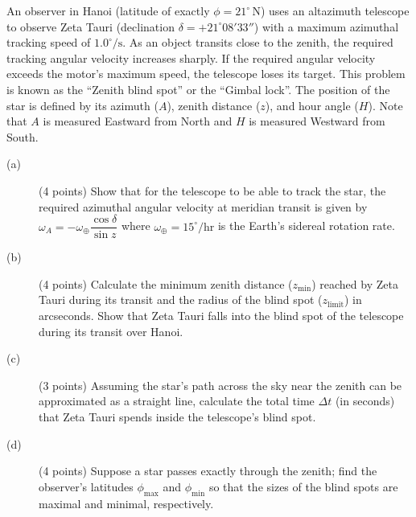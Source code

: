 An observer in Hanoi (latitude of exactly $\phi = 21^\circ\,\mathrm{N}$) uses
an altazimuth telescope to observe Zeta Tauri (declination
$\delta = +21^\circ 08' 33''$) with a maximum azimuthal tracking speed of
$1.0^\circ/\mathrm{s}$. As an object transits close to the zenith, the
required tracking angular velocity increases sharply. If the required angular
velocity exceeds the motor's maximum speed, the telescope loses its target.
This problem is known as the ``Zenith blind spot'' or the ``Gimbal lock''. The
position of the star is defined by its azimuth ($A$), zenith distance ($z$),
and hour angle ($H$). Note that $A$ is measured Eastward from North and $H$ is
measured Westward from South.

\begin{description}
\item[(a)] (4 points) Show that for the telescope to be able to track the
  star, the required azimuthal angular velocity at meridian transit is given
  by $\omega_A = -\omega_\oplus \dfrac{\cos\delta}{\sin z}$ where
  $\omega_\oplus = 15^\circ/\mathrm{hr}$ is the Earth's sidereal rotation
  rate.
\item[(b)] (4 points) Calculate the minimum zenith distance
  ($z_{\mathrm{min}}$) reached by Zeta Tauri during its transit and the radius
  of the blind spot ($z_{\mathrm{limit}}$) in arcseconds. Show that Zeta Tauri
  falls into the blind spot of the telescope during its transit over Hanoi.
\item[(c)] (3 points) Assuming the star's path across the sky near the zenith
  can be approximated as a straight line, calculate the total time $\Delta t$
  (in seconds) that Zeta Tauri spends inside the telescope's blind spot.
\item[(d)] (4 points) Suppose a star passes exactly through the zenith; find
  the observer's latitudes $\phi_{\mathrm{max}}$ and $\phi_{\mathrm{min}}$ so
  that the sizes of the blind spots are maximal and minimal, respectively.
\end{description}

